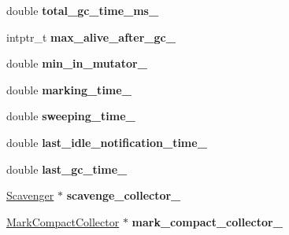 \begin{DoxyCompactItemize}
\item 
double {\bfseries total\+\_\+gc\+\_\+time\+\_\+ms\+\_\+}\hypertarget{classv8_1_1internal_1_1_heap_a431ad1c2a8677446c11390e332460665}{}\label{classv8_1_1internal_1_1_heap_a431ad1c2a8677446c11390e332460665}

\item 
intptr\+\_\+t {\bfseries max\+\_\+alive\+\_\+after\+\_\+gc\+\_\+}\hypertarget{classv8_1_1internal_1_1_heap_adb89a0a24f6a667c6a1d9acb208d60db}{}\label{classv8_1_1internal_1_1_heap_adb89a0a24f6a667c6a1d9acb208d60db}

\item 
double {\bfseries min\+\_\+in\+\_\+mutator\+\_\+}\hypertarget{classv8_1_1internal_1_1_heap_ae8a11de6063d9d258b84849fbf80fd67}{}\label{classv8_1_1internal_1_1_heap_ae8a11de6063d9d258b84849fbf80fd67}

\item 
double {\bfseries marking\+\_\+time\+\_\+}\hypertarget{classv8_1_1internal_1_1_heap_aba21222ab256522034c7ca9381579588}{}\label{classv8_1_1internal_1_1_heap_aba21222ab256522034c7ca9381579588}

\item 
double {\bfseries sweeping\+\_\+time\+\_\+}\hypertarget{classv8_1_1internal_1_1_heap_ade76224ae5ab1b0be0812ff443c3f901}{}\label{classv8_1_1internal_1_1_heap_ade76224ae5ab1b0be0812ff443c3f901}

\item 
double {\bfseries last\+\_\+idle\+\_\+notification\+\_\+time\+\_\+}\hypertarget{classv8_1_1internal_1_1_heap_a6b075208145c4bd9bb50c783ad658eea}{}\label{classv8_1_1internal_1_1_heap_a6b075208145c4bd9bb50c783ad658eea}

\item 
double {\bfseries last\+\_\+gc\+\_\+time\+\_\+}\hypertarget{classv8_1_1internal_1_1_heap_a22f92d2b2c6da51a35b47de47eb02c75}{}\label{classv8_1_1internal_1_1_heap_a22f92d2b2c6da51a35b47de47eb02c75}

\item 
\hyperlink{classv8_1_1internal_1_1_scavenger}{Scavenger} $\ast$ {\bfseries scavenge\+\_\+collector\+\_\+}\hypertarget{classv8_1_1internal_1_1_heap_a52592d0cbcfb0cf41de8961873dd6a70}{}\label{classv8_1_1internal_1_1_heap_a52592d0cbcfb0cf41de8961873dd6a70}

\item 
\hyperlink{classv8_1_1internal_1_1_mark_compact_collector}{Mark\+Compact\+Collector} $\ast$ {\bfseries mark\+\_\+compact\+\_\+collector\+\_\+}\hypertarget{classv8_1_1internal_1_1_heap_ada086109fab01f70fa55a290a10efe8c}{}\label{classv8_1_1internal_1_1_heap_ada086109fab01f70fa55a290a10efe8c}


\end{DoxyCompactItemize}

